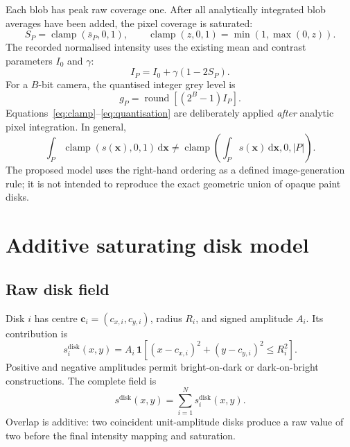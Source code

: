 \documentclass[11pt,a4paper]{article}
\newcommand{\ind}{\mathbf{1}}
\newcommand{\clamp}{\operatorname{clamp}}
\begin{document}
Each blob has peak raw coverage one.  After all analytically integrated blob
averages have been added, the pixel coverage is saturated:
\begin{equation}
S_P=\clamp\!\left(\bar{s}_P,0,1\right),
\qquad
\clamp(z,0,1)=\min\!\left(1,\max(0,z)\right).
\label{eq:clamp}
\end{equation}
The recorded normalised intensity uses the existing mean and contrast
parameters $I_0$ and $\gamma$:
\begin{equation}
I_P=I_0+\gamma\left(1-2S_P\right).
\label{eq:affine-map}
\end{equation}
For a $B$-bit camera, the quantised integer grey level is
\begin{equation}
g_P
=
\operatorname{round}\!\left[(2^B-1)I_P\right].
\label{eq:quantisation}
\end{equation}
Equations~\eqref{eq:clamp}--\eqref{eq:quantisation} are deliberately applied
\emph{after} analytic pixel integration. In general,
\begin{equation}
\int_P \clamp\!\left(s(\bm{x}),0,1\right)\,\mathrm{d}\bm{x}
\neq
\clamp\!\left(\int_P s(\bm{x})\,\mathrm{d}\bm{x},0,|P|\right).
\end{equation}
The proposed model uses the right-hand ordering as a defined image-generation
rule; it is not intended to reproduce the exact geometric union of opaque paint
disks.

\section{Additive saturating disk model}

\subsection{Raw disk field}

Disk $i$ has centre $\bm{c}_i=(c_{x,i},c_{y,i})$, radius $R_i$, and signed
amplitude $A_i$. Its contribution is
\begin{equation}
s_i^{\mathrm{disk}}(x,y)
=
A_i\,
\ind\!\left[(x-c_{x,i})^2+(y-c_{y,i})^2\le R_i^2\right].
\label{eq:disk-field}
\end{equation}
Positive and negative amplitudes permit bright-on-dark or dark-on-bright
constructions. The complete field is
\begin{equation}
s^{\mathrm{disk}}(x,y)
=
\sum_{i=1}^{N}s_i^{\mathrm{disk}}(x,y).
\end{equation}
Overlap is additive: two coincident unit-amplitude disks produce a raw value of
two before the final intensity mapping and saturation.
\end{document}
